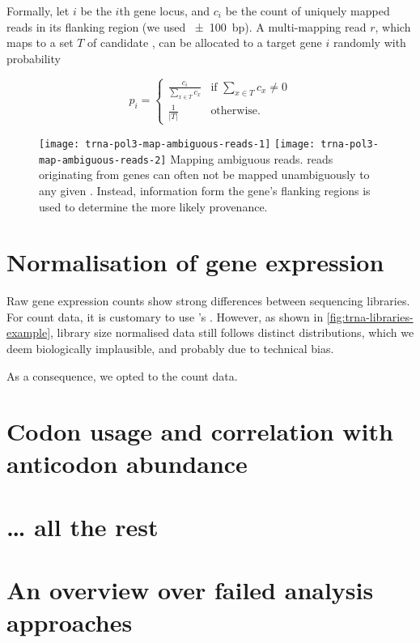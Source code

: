 Formally, let \(i\) be the \(i\)th \trna gene locus, and \(c_i\) be the count of
uniquely mapped reads in its flanking region (we used \SI{\pm100}{bp}). A
multi-mapping read \(r\), which maps to a set \(T\) of candidate \trna[s], can
be allocated to a target \trna gene \(i\) randomly with probability

\begin{equation}
    p_i = \begin{cases}
        \frac{c_i}{\sum_{x \in T}c_x} & \text{if } \sum_{x \in T}c_x \neq 0 \\
        \frac{1}{\vert T \rvert} & \text{otherwise.}
    \end{cases}
\end{equation}

\begin{figure}[h]
    \centering
    \begingroup
        \texttt{[image: trna-pol3-map-ambiguous-reads-1]}
    \endgroup
    \begingroup
        \texttt{[image: trna-pol3-map-ambiguous-reads-2]}
    \endgroup
        {Mapping ambiguous \chip reads.}
        {\chip reads originating from \trna genes can often not be mapped
        unambiguously to any given \trna. Instead, information form the gene’s
        flanking regions is used to determine the more likely provenance.}
\end{figure}

\section{Normalisation of \trna gene expression}

Raw \trna gene expression counts show strong differences between sequencing
libraries. For \mrna count data, it is customary to use ’s
 \citep{Anders:2010}. However, as shown in
\cref{fig:trna-libraries-example}, library size normalised data still follows
distinct distributions, which we deem biologically implausible, and probably due
to technical bias.

As a consequence, we opted to  the count data.


\section{Codon usage and correlation with anticodon abundance}

\section{… all the rest}

\section{An overview over failed analysis approaches}
